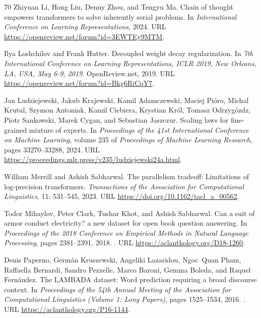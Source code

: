 \documentclass[]{bytedance_seed}
\theoremstyle{definition}
\theoremstyle{remark}
\begin{document}
\begin{thebibliography}{70}
Zhiyuan Li, Hong Liu, Denny Zhou, and Tengyu Ma.
\newblock Chain of thought empowers transformers to solve inherently serial
  problems.
\newblock In \emph{International Conference on Learning Representations},
  2024{}.
\newblock URL \url{https://openreview.net/forum?id=3EWTEy9MTM}.

Ilya Loshchilov and Frank Hutter.
\newblock Decoupled weight decay regularization.
\newblock In \emph{7th International Conference on Learning Representations,
  {ICLR} 2019, New Orleans, LA, USA, May 6-9, 2019}. OpenReview.net, 2019.
\newblock URL \url{https://openreview.net/forum?id=Bkg6RiCqY7}.

Jan Ludziejewski, Jakub Krajewski, Kamil Adamczewski, Maciej Pi{\'o}ro, Michal
  Krutul, Szymon Antoniak, Kamil Ciebiera, Krystian Kr{\'o}l, Tomasz
  Odrzyg{\'o}zdz, Piotr Sankowski, Marek Cygan, and Sebastian Jaszczur.
\newblock Scaling laws for fine-grained mixture of experts.
\newblock In \emph{Proceedings of the 41st International Conference on Machine
  Learning}, volume 235 of \emph{Proceedings of Machine Learning Research},
  pages 33270--33288, 2024.
\newblock URL \url{https://proceedings.mlr.press/v235/ludziejewski24a.html}.

William Merrill and Ashish Sabharwal.
\newblock The parallelism tradeoff: Limitations of log-precision transformers.
\newblock \emph{Transactions of the Association for Computational Linguistics},
  11: 531--545, 2023.
\newblock URL \url{https://doi.org/10.1162/tacl_a_00562}.

Todor Mihaylov, Peter Clark, Tushar Khot, and Ashish Sabharwal.
\newblock Can a suit of armor conduct electricity? a new dataset for open book
  question answering.
\newblock In \emph{Proceedings of the 2018 Conference on Empirical Methods in
  Natural Language Processing}, pages 2381--2391, 2018.
\newblock {}.
\newblock URL \url{https://aclanthology.org/D18-1260}.

Denis Paperno, Germ{\'a}n Kruszewski, Angeliki Lazaridou, Ngoc~Quan Pham,
  Raffaella Bernardi, Sandro Pezzelle, Marco Baroni, Gemma Boleda, and Raquel
  Fern{\'a}ndez.
\newblock The {LAMBADA} dataset: Word prediction requiring a broad discourse
  context.
\newblock In \emph{Proceedings of the 54th Annual Meeting of the Association
  for Computational Linguistics (Volume 1: Long Papers)}, pages 1525--1534,
  2016.
\newblock {}.
\newblock URL \url{https://aclanthology.org/P16-1144}.


\end{thebibliography}
\end{document}
